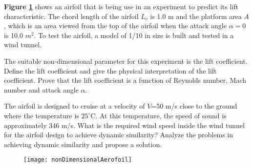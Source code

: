 		
		\listclose

	
	\clearpage 

	
	\item \label{b} \textbf{Figure \ref{fig:nonDimensionalAerofoil}} shows an airfoil that is being use in an experiment to predict its lift characteristic. The chord length of the airfoil $L_{c}$ is 1.0 m and the platform area $A$, which is an area viewed from the top of the airfoil when the attack angle $\alpha = 0$ is 10.0 $m^{2}$. To test the airfoil, a model of 1/10 in size is built and tested in a wind tunnel.  
	
	

\listbegin

	\item \label{b1} The suitable non-dimensional parameter for this experiment is the lift coefficient. Define the lift coefficient and give the physical interpretation of the lift coefficient. Prove that the lift coefficient is a function of Reynolds number, Mach number and attack angle $\alpha$.    
	

	
	\item The airfoil is designed to cruise at a velocity of $V$=50 m/s close to the ground where the temperature is $25^{\circ}$C. At this temperature, the speed of sound is approximately 346 m/s. What is the required wind speed inside the wind tunnel for the airfoil design to achieve dynamic similarity? Analyze the problems in achieving dynamic similarity and propose a solution.
	


\listclose

		\begin{figure}[H] %
		\centering
		\texttt{[image: nonDimensionalAerofoil]}
		\caption{\rajah}
		\label{fig:nonDimensionalAerofoil}
	    \end{figure}	


\listclose	%

